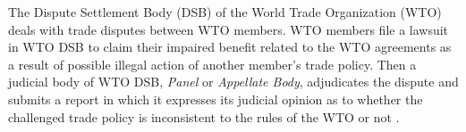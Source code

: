The Dispute Settlement Body (DSB) of
the World Trade Organization (WTO) deals
with trade disputes between WTO members.
WTO members file a lawsuit in WTO DSB to
claim their impaired benefit related to the WTO agreements as a result of possible illegal action of another member's trade policy.
Then a judicial body of WTO DSB, \textit{Panel} or \textit{Appellate Body}, %
adjudicates the dispute and submits a report in which it expresses
its judicial opinion as to whether the challenged
trade policy is inconsistent to the rules of the WTO or not \citep{world2017handbook}.
 
